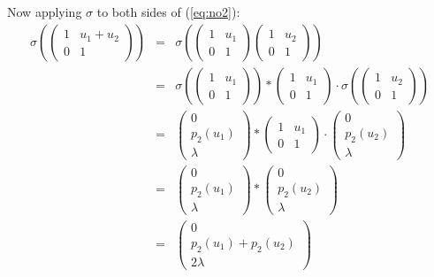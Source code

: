 Now applying $\sigma$ to both sides of (\ref{eq:no2}):
\begin{eqnarray*}
\sigma\left(
	\left(\begin{matrix} 1 & u_1 + u_2 \\ 0 & 1 \end{matrix}\right)
\right)
&=&
\sigma\left(
	\left(\begin{matrix} 1 & u_1 \\ 0 & 1 \end{matrix}\right) 
	\left(\begin{matrix} 1 & u_2 \\ 0 & 1 \end{matrix}\right)
\right) \\
&=&
\sigma\left(
	\left(\begin{matrix} 1 & u_1 \\ 0 & 1 \end{matrix}\right)
\right) *
\left(\begin{matrix} 1 & u_1 \\ 0 & 1 \end{matrix}\right) \cdot
\sigma\left(
	\left(\begin{matrix} 1 & u_2 \\ 0 & 1 \end{matrix}\right)
\right) \\
&=&
\left(\begin{matrix} 0 \\ p_2(u_1) \\ \lambda \end{matrix}\right)
*
\left(\begin{matrix} 1 & u_1 \\ 0 & 1 \end{matrix}\right) \cdot
\left(\begin{matrix} 0 \\ p_2(u_2) \\ \lambda \end{matrix}\right) \\
&=&
\left(\begin{matrix} 0 \\ p_2(u_1) \\ \lambda \end{matrix}\right)
*
\left(\begin{matrix} 0 \\ p_2(u_2) \\ \lambda \end{matrix}\right) \\
&=&
\left(\begin{matrix} 0 \\ p_2(u_1) + p_2(u_2)\\ 2\lambda \end{matrix}\right)
\end{eqnarray*}

